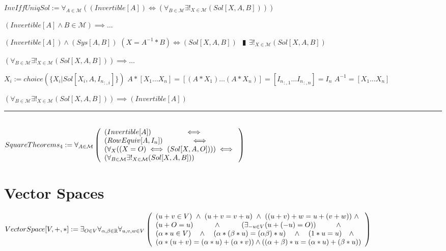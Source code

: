 \documentclass{book}
\newcommand{\abr}{:=}
\newcommand{\pipe}{$\phantom{(}\vrectangleblack\phantom{)}$}
\begin{document}
$InvIffUniqSol \abr \forall_{A \in \mathcal{M}}((Invertible[A]) \iff (\forall_{B \in \mathcal{M}} \exists!_{X \in \mathcal{M}}(Sol[X, A, B])))$
\begin{enumerate}
  \lit $(Invertible[A] \land B \in \mathcal{M}) \implies \ldots$
  \begin{enumerate}
    \lit $(Invertible[A]) \land (Sys[A, B])$
    \lit $(X = A^{-1} * B) \iff (Sol[X, A, B])$ \pipe $\exists!_{X \in \mathcal{M}}(Sol[X, A, B])$
  \end{enumerate}
  \lit $(\forall_{B \in \mathcal{M}} \exists!_{X \in \mathcal{M}}(Sol[X, A, B])) \implies \ldots$
  \begin{enumerate}
    \lit $X_i \abr choice(\{X_i | Sol[X_i, A, {I_n}_{:, i}]\})$
    \lit $A * [X_1 \ldots X_n] = [(A * X_1) \ldots (A * X_n)] =  [{I_n}_{:, 1} \ldots {I_n}_{:, n}] = I_n$ \lit $A^{-1} = [X_1 \ldots X_n]$
  \end{enumerate}
  \lit $(\forall_{B \in \mathcal{M}} \exists!_{X \in \mathcal{M}}(Sol[X, A, B])) \implies (Invertible[A])$
\end{enumerate} \vspace{.75mm} \hrule \vspace{.75mm} \ \\ 

$SquareTheorems_4 \abr \forall_{A \in \mathcal{M}}\left(\begin{array}{ll}
  (Invertible[A]) \hfill \iff \hfill \\
  (RowEquiv[A, I_n]) \hfill \iff \hfill \\
  (\forall_{X}((X = O) \iff (Sol[X, A, O]))) \hfill \iff \hfill \\
  (\forall_{B \in \mathcal{M}} \exists!_{X \in \mathcal{M}}(Sol[X, A, B]))
\end{array}\right)$ \\

\section{Vector Spaces}
$VectorSpace[V, +, *] \abr \exists_{O \in V} \forall_{\alpha ,\beta \in \mathbb{R}} \forall_{u, v, w \in V} \left(\begin{array}{ll}
  (u + v \in V) \hfill \land \hfill (u + v = v + u) \hfill \land \hfill ((u + v) + w = u + (v + w)) \hfill \land \hfill \\
  (u + O = u) \hfill \land \hfill (\exists_{-u \in V}(u + (-u) = O)) \hfill \land \hfill \\
  (\alpha * u \in V) \hfill \land \hfill (\alpha * (\beta * u) = (\alpha \beta) * u) \hfill \land \hfill (1 * u = u) \hfill \land \hfill \\
  (\alpha * (u + v) = (\alpha * u) + (\alpha * v))  \hfill \land \hfill ((\alpha + \beta) * u = (\alpha * u) + (\beta * u)) \\
\end{array}\right)$
\end{document}
